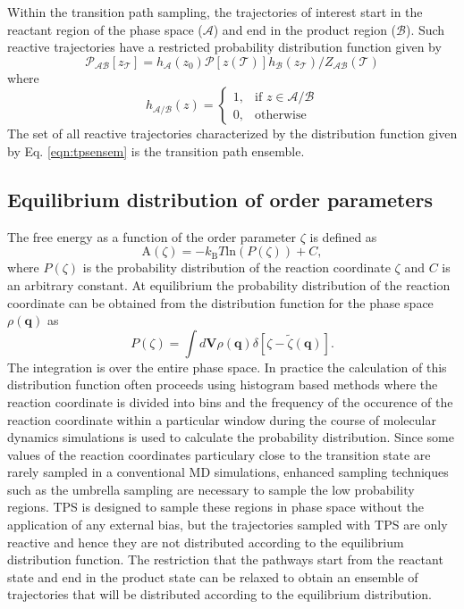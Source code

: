 \documentclass[journal=jpcbfk,manuscript=article,layout=twocolumn]{achemso}
\begin{document}
Within the transition path sampling, the trajectories of interest start in the reactant region of the 
phase space ($\mathcal{A}$) and end in the product region ($\mathcal{B}$). Such reactive trajectories have 
a restricted probability distribution function given by
\begin{equation}
\mathcal{P}_{\mathcal{AB}}[z_{\mathcal{T}}] = h_{\mathcal{A}}(z_0)\mathcal{P}[z(\mathcal{T})]
h_{\mathcal{B}}(z_{\mathcal{T}})/Z_{\mathcal{AB}}(\mathcal{T})\label{eqn:tpsensem}
\end{equation}
where 
\[
    h_{\mathcal{A}/\mathcal{B}}(z)= 
\begin{cases}
    1, & \text{if } z\in \mathcal{A}/\mathcal{B}\\
    0,              & \text{otherwise}
\end{cases}
\]
The set of all reactive trajectories characterized by the distribution function
given by Eq. \ref{eqn:tpsensem} is the transition path ensemble. 

\subsection{Equilibrium distribution of order parameters}
The free energy as a function of the order parameter $\zeta$ is defined
as 
\begin{equation}
\text{A}(\zeta) = -k_{\text{B}}T\text{ln}(P(\zeta)) + C, \label{eqn:fenergy}
\end{equation}
where $P(\zeta)$ is the probability distribution of the reaction coordinate
$\zeta$ and $C$ is an arbitrary constant. At equilibrium the probability distribution of the 
reaction coordinate 
can be obtained from the distribution function for the phase space $\rho(\textbf{q})$ as
\begin{equation}
P(\zeta) = \int d\textbf{V} \rho(\textbf{q})\delta\left[\zeta-\tilde{\zeta}(\textbf{q})\right].
\end{equation}
The integration is over the entire phase space. In practice the calculation of this distribution function
often proceeds using histogram based methods where the reaction coordinate is 
divided into bins and the frequency of the occurence of the reaction coordinate within a particular window
during the course of molecular dynamics simulations is used to calculate the probability distribution. 
Since some values of the reaction coordinates particulary close to the transition state are 
rarely sampled in a conventional MD simulations, enhanced sampling techniques such as the umbrella sampling
are necessary to sample the low probability regions. TPS is designed to sample these regions in phase space 
without the application of any external bias, but the trajectories sampled with TPS are only reactive and hence
they are not distributed according to the equilibrium distribution function. 
The restriction that the pathways start from the reactant state and end in the product state can be relaxed
to obtain an ensemble of trajectories that will be distributed according to the equilibrium distribution. 
\end{document}
